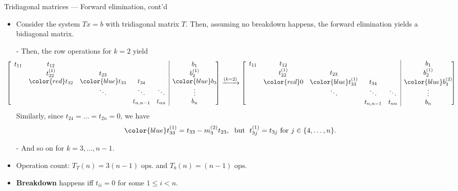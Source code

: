 \documentclass[t,usepdftitle=false]{beamer}
\begin{document}
\begin{frame}{Tridiagonal matrices --- Forward elimination, cont'd}
\begin{itemize}
\item Consider the system $Tx=b$ with tridiagonal matrix $T$. Then, assuming no breakdown happens, the forward elimination yields a bidiagonal matrix.
\item[-] Then, the row operations for $k=2$ yield
\small
\begin{align*}
\hspace{-.55cm}
\left[\begin{array}{ccccc|c}
t_{11}         & t_{12}                     &                      &           &           & b_1\!\!\!\!\\
               & t_{22}^{(1)}               & t_{23}               &           &           & b_2^{(1)}\!\!\!\!\\
               & {\color{red}t_{32}}        & {\color{blue}t_{33}} & t_{34}    &           & {\color{blue}b_3}\!\!\!\!\\
               &                            & \ddots               & \ddots    & \ddots    & \vdots\!\!\!\!\\
               &                            &                      & t_{n,n-1} & t_{nn}    & b_n\!\!\!\! 
\end{array}\right]
\xrightarrow{(k=2)}
\left[\begin{array}{ccccc|c}
t_{11}         & t_{12}                     &        &        &           & b_1       \!\! \!\!               \\
               & t_{22}^{(1)} & t_{23} &        &           & b_2^{(1)} \!\!\!\!  \\
               & {\color{red}0}             & {\color{blue}t_{33}^{(1)}}  & t_{34} &           & {\color{blue}b_3^{(2)}} \!\!\!\!                      \\
               &                            & \ddots & \ddots & \ddots    & \vdots      \!\!\!\!              \\
               &                            &        & t_{n,n-1} & t_{nn} & b_n \!\!\!\!  
\end{array}\right]
\end{align*}\normalsize
Similarly, since $t_{24}=\dots=t_{2n}=0$, we have
\begin{align*}
{\color{blue}t_{33}^{(1)}}=t_{33}-m_3^{(2)}t_{23},
\;\text{ but }\;
t_{3j}^{(1)}=t_{3j}
\text{ for }j\in\{4,\dots,n\}.
\end{align*}
\item[-] And so on for $k=3,\dots,n-1$.
\item Operation count: $T_T(n)=3(n-1)\text{ ops.}$ and $T_b(n)=(n-1)\text{ ops.}$
\item \textbf{{\color{red}Breakdown}} happens iff $t_{ii}=0$ for some $1\leq i< n$.
\end{itemize}
\end{frame}
\end{document}
